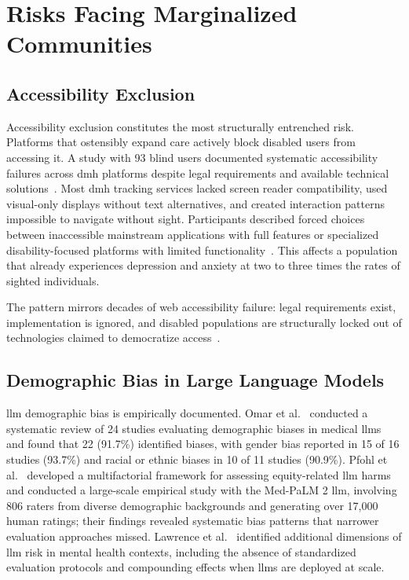 \section{Risks Facing Marginalized Communities}

\subsection{Accessibility Exclusion}

Accessibility exclusion constitutes the most structurally entrenched risk. Platforms that ostensibly expand care actively block disabled users from accessing it. A study with 93 blind users documented systematic accessibility failures across \gls{dmh} platforms despite legal requirements and available technical solutions~\cite{khan_seo_2025}. Most \gls{dmh} tracking services lacked screen reader compatibility, used visual-only displays without text alternatives, and created interaction patterns impossible to navigate without sight. Participants described forced choices between inaccessible mainstream applications with full features or specialized disability-focused platforms with limited functionality~\cite{khan_seo_2025}. This affects a population that already experiences depression and anxiety at two to three times the rates of sighted individuals.

The pattern mirrors decades of web accessibility failure: legal requirements exist, implementation is ignored, and disabled populations are structurally locked out of technologies claimed to democratize access~\cite{khan_seo_2025}.

\subsection{Demographic Bias in Large Language Models}

\gls{llm} demographic bias is empirically documented. Omar et al.~\cite{omar_2025} conducted a systematic review of 24 studies evaluating demographic biases in medical \gls{llm}s and found that 22 (91.7\%) identified biases, with gender bias reported in 15 of 16 studies (93.7\%) and racial or ethnic biases in 10 of 11 studies (90.9\%). Pfohl et al.~\cite{pfohl_2024} developed a multifactorial framework for assessing equity-related \gls{llm} harms and conducted a large-scale empirical study with the Med-PaLM 2 \gls{llm}, involving 806 raters from diverse demographic backgrounds and generating over 17,000 human ratings; their findings revealed systematic bias patterns that narrower evaluation approaches missed. Lawrence et al.~\cite{lawrence_2024} identified additional dimensions of \gls{llm} risk in mental health contexts, including the absence of standardized evaluation protocols and compounding effects when \gls{llm}s are deployed at scale.

